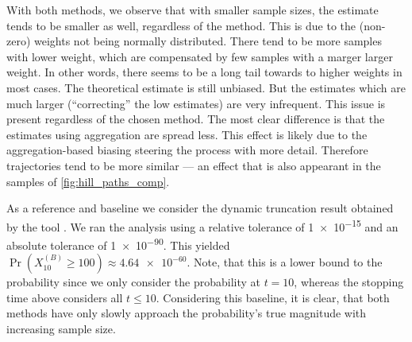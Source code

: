 With both methods, we observe that with smaller sample sizes, the estimate tends to be smaller as well, regardless of the method.
This is due to the (non-zero) weights not being normally distributed.
There tend to be more samples with lower weight, which are compensated by few samples with a marger larger weight.
In other words, there seems to be a long tail towards to higher weights in most cases.
The theoretical estimate is still unbiased.
But the estimates which are much larger (``correcting'' the low estimates) are very infrequent.
This issue is present regardless of the chosen method.
The most clear difference is that the estimates using aggregation are spread less.
This effect is likely due to the aggregation-based biasing steering the process with more detail.
Therefore trajectories tend to be more similar --- an effect that is also appearant in the samples of \autoref{fig:hill_paths_comp}.

As a reference and baseline we consider the dynamic truncation result obtained by the  tool \parencite{lapin2011shave}.
We ran the analysis using a relative tolerance of \num{1e-15} and an absolute tolerance of \num{1e-90}.
This yielded \(\Pr(X_{10}^{(B)} \geq 100) \approx \num{4.64e-60}\).
Note, that this is a lower bound to the probability since we only consider the probability at $t=10$, whereas the stopping time above considers all $t\leq 10$.
Considering this baseline, it is clear, that both methods have only slowly approach the probability's true magnitude with increasing sample size.

